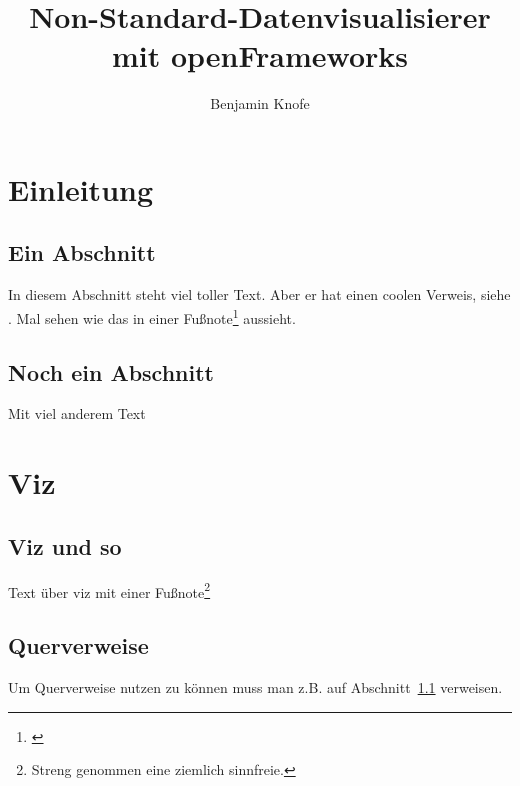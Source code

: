 \documentclass[a4paper, 12pt, headsepline]{scrreprt}
\begin{document}
\title{Non-Standard-Datenvisualisierer mit openFrameworks}
\author{Benjamin Knofe}
\subject{Diplomarbeit}
\publishers{Hochschule für Technik, Wirtschaft und Kultur Leipzig}
\dedication{viele nette Leute}
\maketitle

\tableofcontents

\chapter{Einleitung}
\section{Ein Abschnitt}
\label{sec:testi}

In diesem Abschnitt steht viel toller Text.
Aber er hat einen coolen Verweis, siehe \cite[S.\,35--38]{Visualisierung}.
Mal sehen wie das in einer Fußnote\footnote{\cite{Visualisierung}} aussieht.

\section{Noch ein Abschnitt}
Mit viel anderem Text

\chapter{Viz}

\section{Viz und so}

Text über viz mit einer Fußnote\footnote{Streng genommen eine ziemlich sinnfreie.}

\section{Querverweise}

Um Querverweise nutzen zu können muss man z.B. auf Abschnitt~\ref{sec:testi} verweisen.



\end{document}
